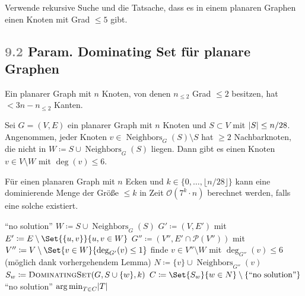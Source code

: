 \documentclass{cheat-sheet}
\newcommand{\size}[1]{\abs{#1}} %
\DeclareMathOperator*{\argmin}{arg\,min}
\newcommand{\Powerset}{\mathcal{P}} %
\renewcommand{\O}{\mathcal{O}} %
\newcommand{\floor}[1]{\lfloor #1 \rfloor} %
\DeclareMathOperator{\Neighbors}{Neighbors} %
\newcommand{\IndentState}[1]{\State \quad #1}
\newcommand{\Problem}[1]{\textcolor{ProblemColor}{\textbf{#1}}}
\newcommand{\scriptSection}[1]{\textcolor{gray}{#1}\enspace}
\begin{document}
\begin{idee}
  Verwende rekursive Suche und die Tatsache, dass es in einem planaren Graphen einen Knoten mit Grad $\leq 5$ gibt.
\end{idee}

\subsection{\scriptSection{9.2} Param. \Problem{Dominating Set} für planare Graphen}

\begin{lem}
  Ein planarer Graph mit $n$ Knoten, von denen $n_{\leq 2}$ Grad $\leq 2$ besitzen, hat $< 3 n - n_{\leq 2}$ Kanten.
\end{lem}

\begin{lem}
  Sei $G = (V, E)$ ein planarer Graph mit $n$ Knoten und $S \subset V$ mit $\size{S} \leq n/28$.
  Angenommen, jeder Knoten $v \in \Neighbors_G(S) \setminus S$ hat $\geq 2$ Nachbarknoten, die nicht in $W \coloneqq S \cup \Neighbors_G(S)$ liegen.
  Dann gibt es einen Knoten $v \in V \setminus W$ mit $\deg(v) \leq 6$.
\end{lem}

\begin{satz}
  Für einen planaren Graph mit $n$ Ecken und $k \in \{ 0, \ldots, \floor{n / 28} \}$ kann eine dominierende Menge der Größe $\leq k$ in Zeit $\O(7^k \cdot n)$ berechnet werden, falls eine solche existiert.
\end{satz}

\begin{algorithmic}
    \If{$\size{S} > k$} \Return ``no solution'' \EndIf
    \State $W \coloneqq S \cup \Neighbors_G(S)$
    \State $G' \coloneqq (V, E')$ mit $E' \coloneqq E \setminus \Set{\{ u, v \}}{u, v \in W}$
    \State $G'' \coloneqq (V'', E' \cap \Powerset(V''))$ mit $V'' \coloneqq V \setminus \Set{v \in W}{\deg_{G'}(v) \leq 1}$
    \State finde $v \in V'' \setminus W$ mit $\deg_{G''}(v) \leq 6$
    \IndentState (möglich dank vorhergehendem Lemma)
    \State $N \coloneqq \{ v \} \cup \Neighbors_{G''}(v)$
      $S_w \coloneqq \Call{DominatingSet}{G, S \cup \{ w \}, k}$
    \EndFor
    \State $C \coloneqq \Set{S_w}{w \in N} \setminus \{ \text{``no solution''} \}$
     \Return ``no solution'' \EndIf
    \State \Return ${\argmin}_{T \in C} \size{T}$
  \EndFunction
\end{algorithmic}
\end{document}
